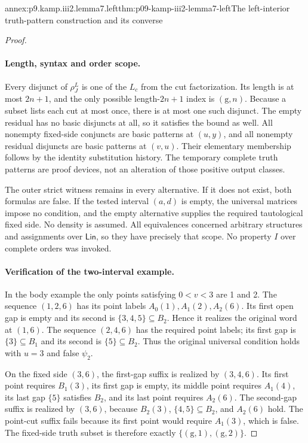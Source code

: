 \begin{annexitem}{annex:p9.kamp.iii2.lemma7.left}{thm:p09-kamp-iii2-lemma7-left}{The left-interior truth-pattern construction and its converse}
\begin{proof}
\paragraph{Length, syntax and order scope.}
Every disjunct of \(\rho_J^L\) is one of the \(L_c\)
from the cut factorization. Its length is at most \(2n+1\),
and the only possible length-\(2n+1\) index is
\((\mathrm g,n)\). Because a subset lists each cut at most
once, there is at most one such disjunct. The empty residual has
no basic disjuncts at all, so it satisfies the bound as well.
All nonempty fixed-side conjuncts are basic patterns at \((u,y)\),
and all nonempty residual disjuncts are basic patterns at \((v,u)\).
Their elementary membership follows by the identity substitution
history. The temporary complete truth patterns are proof devices,
not an alteration of those positive output classes.

The outer strict witness remains in every alternative. If it does not
exist, both formulas are false. If the tested interval \((a,d)\)
is empty, the universal matrices impose no condition, and the empty
alternative supplies the required tautological fixed side. No density
is assumed. All equivalences concerned arbitrary structures and
assignments over \(\mathsf{Lin}\), so they have precisely that
scope. No property \(I\) over complete orders was invoked.

\paragraph{Verification of the two-interval example.}
In the body example the only points satisfying \(0<v<3\) are
1 and 2. The sequence \((1,2,6)\) has its point labels
\(A_0(1),A_1(2),A_2(6)\). Its first open gap is empty and
its second is \(\{3,4,5\}\subseteq B_2\). Hence it realizes
the original word at \((1,6)\). The sequence \((2,4,6)\)
has the required point labels; its first gap is
\(\{3\}\subseteq B_1\) and its second is
\(\{5\}\subseteq B_2\). Thus the original universal condition
holds with \(u=3\) and false \(\psi_2\).

On the fixed side \((3,6)\), the first-gap suffix is realized
by \((3,4,6)\). Its first point requires \(B_1(3)\), its
first gap is empty, its middle point requires \(A_1(4)\), its
last gap \(\{5\}\) satisfies \(B_2\), and its last point
requires \(A_2(6)\). The second-gap suffix is realized by
\((3,6)\), because \(B_2(3)\),
\(\{4,5\}\subseteq B_2\), and \(A_2(6)\) hold.
The point-cut suffix fails because its first point would require
\(A_1(3)\), which is false. The fixed-side truth subset is
therefore exactly \(\{(\mathrm g,1),(\mathrm g,2)\}\).


\end{proof}
\end{annexitem}

